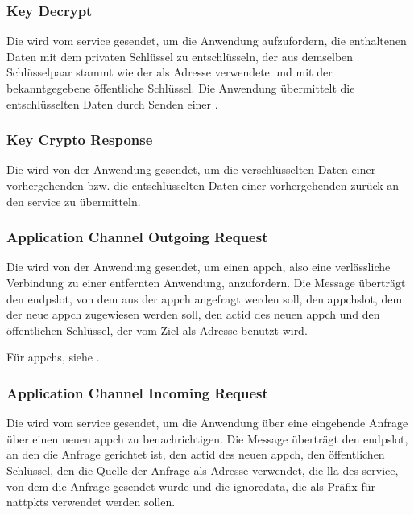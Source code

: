 \asprotokeyencbytefield


\subsubsection{Key Decrypt}
\label{dcl-asproto-keydec}
Die \msg{\asprotokeyenc} wird vom \gls{service} gesendet, um die Anwendung
aufzufordern, die enthaltenen Daten mit dem privaten Schlüssel zu entschlüsseln,
der aus demselben Schlüsselpaar stammt wie der als Adresse verwendete und mit
der \msg{\asprotoaddrpubkey} bekanntgegebene öffentliche Schlüssel.
Die Anwendung übermittelt die entschlüsselten Daten durch Senden einer
\msg{\asprotocryptoresponse}.

\asprotokeydecbytefield


\subsubsection{Key Crypto Response}
\label{dcl-asproto-cryptoresponse}
Die \msg{\asprotocryptoresponse} wird von der Anwendung gesendet, um die
verschlüsselten Daten einer vorhergehenden \msg{\asprotokeyenc} bzw. die
entschlüsselten Daten einer vorhergehenden \msg{\asprotokeydec} zurück an den
\gls{service} zu übermitteln.

\asprotocryptoresponsebytefield


\subsubsection{Application Channel Outgoing Request}
\label{dcl-asproto-appchoutreq}
Die \msg{\asprotoappchoutreq} wird von der Anwendung gesendet, um einen
\gls{appch}, also eine verlässliche Verbindung zu einer entfernten Anwendung,
anzufordern.
Die Message überträgt den \gls{endpslot}, von dem aus der \gls{appch} angefragt
werden soll, den \gls{appchslot}, dem der neue \gls{appch} zugewiesen werden
soll, den \gls{actid} des neuen \gls{appch} und den öffentlichen Schlüssel,
der vom Ziel als Adresse benutzt wird.

Für \glspl{appch}, siehe .

\asprotoappchoutreqbytefield


\subsubsection{Application Channel Incoming Request}
\label{dcl-asproto-appchinreq}
Die \msg{\asprotoappchinreq} wird vom \gls{service} gesendet, um die Anwendung
über eine eingehende Anfrage über einen neuen \gls{appch} zu benachrichtigen.
Die Message überträgt den \gls{endpslot}, an den die Anfrage gerichtet ist,
den \gls{actid} des neuen \gls{appch}, den öffentlichen Schlüssel, den die
Quelle der Anfrage als Adresse verwendet, die \gls{lla} des \gls{service}, von
dem die Anfrage gesendet wurde und die \gls{ignoredata}, die als Präfix für
\glspl{nattpkt} verwendet werden sollen.

